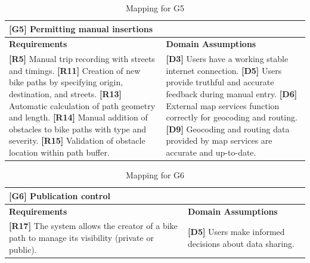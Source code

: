 \begin{table}[H]
    \centering
    \begin{tabular}{|p{7cm}|p{7cm}|}
        \hline
        \multicolumn{2}{|p{14cm}|}{\textbf{[G5]} Permitting manual insertions} \\
        \hline
        \textbf{Requirements} & \textbf{Domain Assumptions} \\
        \hline
        \textbf{[R5]} Manual trip recording with streets and timings. \newline
        \textbf{[R11]} Creation of new bike paths by specifying origin, destination, and streets. \newline
        \textbf{[R13]} Automatic calculation of path geometry and length. \newline
        \textbf{[R14]} Manual addition of obstacles to bike paths with type and severity. \newline
        \textbf{[R15]} Validation of obstacle location within path buffer. & 
        \textbf{[D3]} Users have a working stable internet connection. \newline
        \textbf{[D5]} Users provide truthful and accurate feedback during manual entry. \newline
        \textbf{[D6]} External map services function correctly for geocoding and routing. \newline
        \textbf{[D9]} Geocoding and routing data provided by map services are accurate and up-to-date. \\
        \hline
    \end{tabular}
    \caption{Mapping for G5}
    \label{tab:map_g5}
\end{table}

\begin{table}[H]
    \centering
    \begin{tabular}{|p{7cm}|p{7cm}|}
        \hline
        \multicolumn{2}{|p{14cm}|}{\textbf{[G6]} Publication control} \\
        \hline
        \textbf{Requirements} & \textbf{Domain Assumptions} \\
        \hline
        \textbf{[R17]} The system allows the creator of a bike path to manage its visibility (private or public). & 
        \textbf{[D5]} Users make informed decisions about data sharing. \\
        \hline
    \end{tabular}
    \caption{Mapping for G6}
    \label{tab:map_g6}
\end{table}

